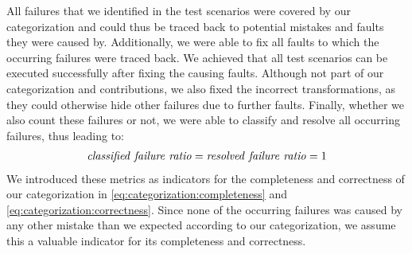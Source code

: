 All failures that we identified in the test scenarios were covered by our categorization and could thus be traced back to potential mistakes and faults they were caused by.
Additionally, we were able to fix all faults to which the occurring failures were traced back.
We achieved that all test scenarios can be executed successfully after fixing the causing faults.
Although not part of our categorization and contributions, we also fixed the incorrect transformations, as they could otherwise hide other failures due to further faults.
Finally, whether we also count these failures or not, we were able to classify and resolve all occurring failures, thus leading to:
\begin{align*}
    \mathvariable{classified\ failure\ ratio} = \mathvariable{resolved\ failure\ ratio}= 1
\end{align*}
We introduced these metrics as indicators for the completeness and correctness of our categorization in \autoref{eq:categorization:completeness} and \autoref{eq:categorization:correctness}.
Since none of the occurring failures was caused by any other mistake than we expected according to our categorization, we assume this a valuable indicator for its completeness and correctness.




